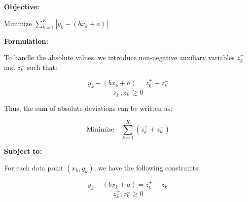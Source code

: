 \documentclass{article}
\begin{document}
\textbf{Objective:}

Minimize \( \sum_{k=1}^{K} |y_k - (bx_k + a)| \)

\textbf{Formulation:}

To handle the absolute values, we introduce non-negative auxiliary variables \( z_k^+ \) and \( z_k^- \) such that:

\[
y_k - (bx_k + a) = z_k^+ - z_k^-
\]
\[
z_k^+, z_k^- \geq 0
\]

Thus, the sum of absolute deviations can be written as:

\[
\text{Minimize} \quad \sum_{k=1}^{K} (z_k^+ + z_k^-)
\]

\textbf{Subject to:}

For each data point \((x_k, y_k)\), we have the following constraints:

\[
y_k - (bx_k + a) = z_k^+ - z_k^-
\]
\[
z_k^+, z_k^- \geq 0 \]
\end{document}
